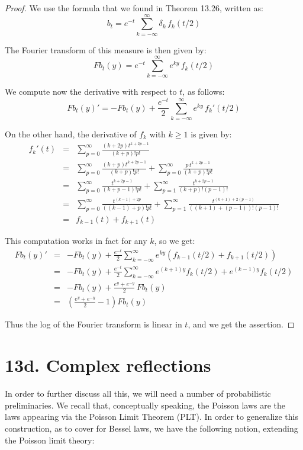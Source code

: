 \documentclass[12pt]{amsbook}
\begin{document}
\begin{proof}
We use the formula that we found in Theorem 13.26, written as:
$$b_t=e^{-t}\sum_{k=-\infty}^\infty\delta_k\,f_k(t/2)$$

The Fourier transform of this measure is then given by:
$$Fb_t(y)=e^{-t}\sum_{k=-\infty}^\infty e^{ky}\,f_k(t/2)$$

We compute now the derivative with respect to $t$, as follows:
$$Fb_t(y)'=-Fb_t(y)+\frac{e^{-t}}{2}\sum_{k=-\infty}^\infty e^{ky}\,f_k'(t/2)$$

On the other hand, the derivative of $f_k$ with $k\geq 1$ is given by:
\begin{eqnarray*}
f_k'(t)
&=&\sum_{p=0}^\infty \frac{(k+2p)t^{k+2p-1}}{(k+p)!p!}\\
&=&\sum_{p=0}^\infty \frac{(k+p)t^{k+2p-1}}{(k+p)!p!}+\sum_{p=0}^\infty\frac{p\,t^{k+2p-1}}{(k+p)!p!}\\
&=&\sum_{p=0}^\infty \frac{t^{k+2p-1}}{(k+p-1)!p!}+\sum_{p=1}^\infty\frac{t^{k+2p-1}}{(k+p)!(p-1)!}\\
&=&\sum_{p=0}^\infty \frac{t^{(k-1)+2p}}{((k-1)+p)!p!}+\sum_{p=1}^\infty\frac{t^{(k+1)+2(p-1)}}{((k+1)+(p-1))!(p-1)!}\\
&=&f_{k-1}(t)+f_{k+1}(t)
\end{eqnarray*}

This computation works in fact for any $k$, so we get:
\begin{eqnarray*}
Fb_t(y)'
&=&-Fb_t(y)+\frac{e^{-t}}{2}
\sum_{k=-\infty}^\infty e^{ky} (f_{k-1}(t/2)+f_{k+1}(t/2))\\
&=&-Fb_t(y)+\frac{e^{-t}}{2} \sum_{k=-\infty}^\infty
e^{(k+1)y}f_{k}(t/2)+e^{(k-1)y}f_{k}(t/2)\\
&=&-Fb_t(y)+\frac{e^{y}+e^{-y}}{2}\,Fb_t(y)\\
&=&\left(\frac{e^{y}+e^{-y}}{2}-1\right)Fb_t(y)
\end{eqnarray*}

Thus the log of the Fourier transform is linear in $t$, and we get
the assertion.
\end{proof}

\section*{13d. Complex reflections}

In order to further discuss all this, we will need a number of probabilistic preliminaries. We recall that, conceptually speaking, the Poisson laws are the laws appearing via the Poisson Limit Theorem (PLT). In order to generalize this construction, as to cover for Bessel laws, we have the following notion, extending the Poisson limit theory:
\end{document}
